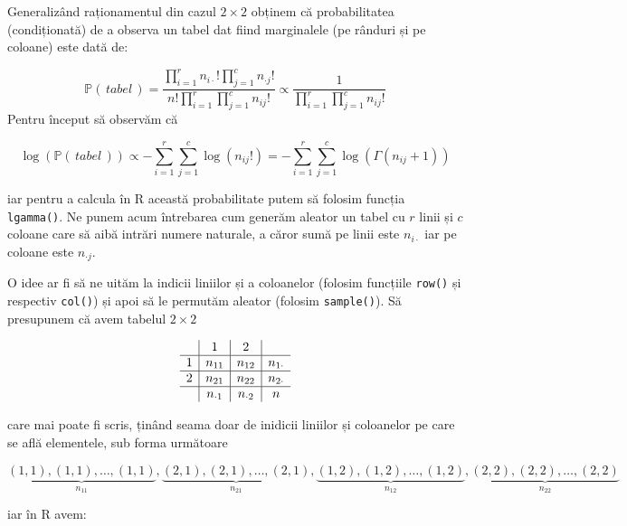 \documentclass[]{article}
\begin{document}
Generalizând raționamentul din cazul \(2 \times 2\) obținem că
probabilitatea (condiționată) de a observa un tabel dat fiind
marginalele (pe rânduri și pe coloane) este dată de:

\[
  \mathbb{P}(\,tabel\,) = \frac{\prod_{i=1}^{r}n_{i\cdot}!\prod_{j=1}^{c}n_{\cdot j}!}{n!\prod_{i=1}^{r}\prod_{j=1}^{c}n_{ij}!}\propto\frac{1}{\prod_{i=1}^{r}\prod_{j=1}^{c}n_{ij}!}
\] Pentru început să observăm că

\[
  \log(\mathbb{P}(\,tabel\,))\propto - \sum_{i=1}^{r}\sum_{j=1}^{c}\log(n_{ij}!) = - \sum_{i=1}^{r}\sum_{j=1}^{c}\log(\Gamma(n_{ij} + 1))
\]

iar pentru a calcula în R această probabilitate putem să folosim funcția
\texttt{lgamma()}. Ne punem acum întrebarea cum generăm aleator un tabel
cu \(r\) linii și \(c\) coloane care să aibă intrări numere naturale, a
căror sumă pe linii este \(n_{i\cdot}\) iar pe coloane este
\(n_{\cdot j}\).

O idee ar fi să ne uităm la indicii liniilor și a coloanelor (folosim
funcțiile \texttt{row()} și respectiv \texttt{col()}) și apoi să le
permutăm aleator (folosim \texttt{sample()}). Să presupunem că avem
tabelul \(2\times 2\)

\[
  \begin{array}{c|c|c|c}
     & 1 & 2 &\\
    \hline
    1 & n_{11} & n_{12} & n_{1\cdot}\\
    \hline
    2 & n_{21} & n_{22} & n_{2\cdot}\\
    \hline
     & n_{\cdot 1} & n_{\cdot 2} & n 
  \end{array}
\]

care mai poate fi scris, ținând seama doar de inidicii liniilor și
coloanelor pe care se află elementele, sub forma următoare

\[
  \underbrace{(1,1), (1,1), \ldots, (1,1)}_{n_{11}},\underbrace{(2,1), (2,1), \ldots, (2,1)}_{n_{21}},\underbrace{(1,2), (1,2), \ldots, (1,2)}_{n_{12}},\underbrace{(2,2), (2,2), \ldots, (2,2)}_{n_{22}}
\]

iar în R avem:
\end{document}
